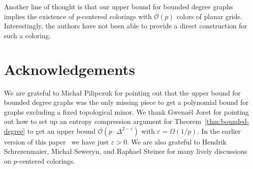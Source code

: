 \documentclass[11pt]{article}
\begin{document}
Another line of thought is that our upper bound for bounded degree graphs implies the existence of $p$-centered colorings 
with $\mathcal{O}(p)$ colors of planar grids.
Interestingly, the authors have not been able to provide a direct construction for such a coloring.

\section*{Acknowledgements}
We are grateful to Micha{\l} Pilipczuk for pointing out 
that the upper bound for bounded degree graphs was the only missing 
piece to get a polynomial bound for graphs excluding a fixed topological minor.
We thank Gwenaël Joret for pointing out how to set up an entropy compression argument 
for Theorem~\ref{thm:bounded-degree} to get
an upper bound $\mathcal{O}(p\cdot\Delta^{2-\varepsilon})$ with $\varepsilon=\Omega(1/p)$. 
In the earlier version of this paper~\cite{DFMS20} we have just $\varepsilon>0$.
We are also grateful to Hendrik Schrezenmaier, Micha{\l} Seweryn, and Raphael Steiner
for many lively discussions on $p$-centered colorings.
\end{document}
